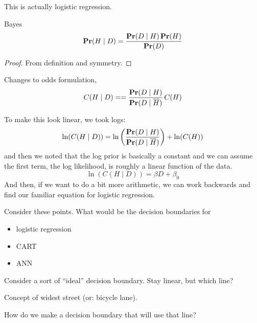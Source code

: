 \begin{soln}
  This is actually logistic regression.

  \begin{theorem}{Bayes}
    \begin{displaymath}
      \mathbf{Pr}(H\mid D) = \frac{\mathbf{Pr}(D\mid H)\, \mathbf{Pr}(H)}{\mathbf{Pr}(D)}
    \end{displaymath}
  \end{theorem}
  \begin{proof}
    From definition and symmetry.
  \end{proof}

  Changes to odds formulation,
  \begin{displaymath}
    C(H\mid D) =
    = \frac{\mathbf{Pr}(D\mid H)}{\mathbf{Pr}(D\mid \overline{H})} \, C(H)
  \end{displaymath}

  To make this look linear, we took logs:
  \begin{displaymath}
    \ln(C(H\mid D)) =
    \ln\left( \frac{\mathbf{Pr}(D\mid H)}{\mathbf{Pr}(D\mid \overline{H})} \right)
    + \ln(C(H))
  \end{displaymath}
  and then we noted that the log prior is basically a constant and we
  can assume the first term, the log likelihood, is roughly a linear
  function of the data.
  \begin{displaymath}
    \ln(C(H\mid D)) = \beta D + \beta_0
  \end{displaymath}
  And then, if we want to do a bit more arithmetic, we can work
  backwards and find our familiar equation for logistic regression.

\end{soln}


Consider these points.  What would be the decision boundaries for
\begin{itemize}
\item logistic regression
\item CART
\item ANN
\end{itemize}

\centerline{}

\bigskip

Consider a sort of ``ideal'' decision boundary.  Stay linear, but
which line?

Concept of widest street (or: bicycle lane).

How do we make a decision boundary that will use that line?

